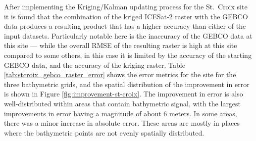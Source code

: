 After implementing the Kriging/Kalman updating process for the St.~Croix site it is found that the combination of the kriged ICESat-2 raster with the GEBCO data produces a resulting product that has a higher accuracy than either of the input datasets. Particularly notable here is the inaccuracy of the GEBCO data at this site --- while the overall RMSE of the resulting raster is high at this site compared to some others, in this case it is limited by the accuracy of the starting GEBCO data, and the accuracy of the kriging raster. Table \ref{tab:stcroix_gebco_raster_error} shows the error metrics for the site for the three bathymetric grids, and the spatial distribution of the improvement in error is shown in Figure \ref{fig:improvement-st-croix}. The improvement in error is also well-distributed within areas that contain bathymetric signal, with the largest improvements in error having a magnitude of about 6 meters. In some areas, there was a minor increase in absolute error. These areas are mostly in places where the bathymetric points are not evenly spatially distributed.


\begin{figure}[htbp]
    \begin{floatrow}
    \end{floatrow}
\end{figure}



